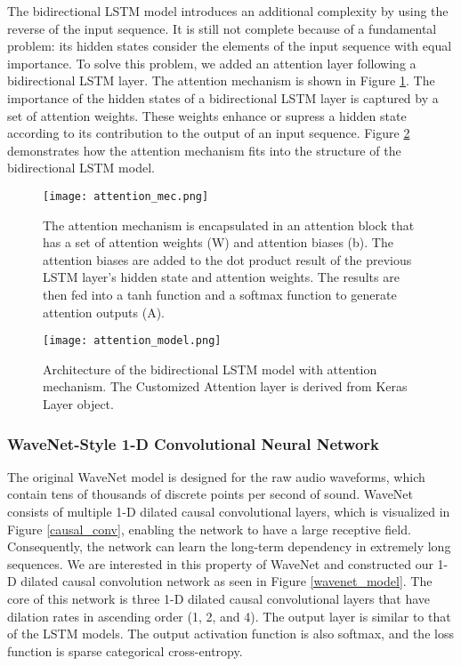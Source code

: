 \documentclass[sigconf,authorversion]{acmart}
\begin{document}
The bidirectional LSTM model introduces an additional complexity by using the 
reverse of the input sequence. It is still not complete because of a fundamental
problem: its hidden states consider the elements of the input sequence with 
equal importance. To solve this problem, we added an attention layer following 
a bidirectional LSTM layer. The attention mechanism is shown in Figure 
\ref{attention_mechanism}. The importance of the hidden states of a bidirectional 
LSTM layer is captured by a set of attention weights. These weights enhance or 
supress a hidden state according to its contribution to the output of an input
sequence. Figure \ref{att_lstm_model} demonstrates how the attention mechanism
fits into the structure of the bidirectional LSTM model.

\begin{figure}[h]
  \centering
  \texttt{[image: attention\_mec.png]}
  \caption{The attention mechanism is encapsulated in an attention block that has
  a set of attention weights (W) and attention biases (b). The attention biases are
  added to the dot product result of the previous LSTM layer's hidden state and 
  attention weights. The results are then fed into a tanh function and a softmax
  function to generate attention outputs (A).}
  \label{attention_mechanism}
\end{figure}

\begin{figure}[h]
  \centering
  \texttt{[image: attention\_model.png]}
  \caption{Architecture of the bidirectional LSTM model with attention mechanism.
  The Customized Attention layer is derived from Keras Layer object.}
  \label{att_lstm_model}
\end{figure}

\subsubsection{WaveNet-Style 1-D Convolutional Neural Network}

The original WaveNet model is designed for the raw audio waveforms, which contain
tens of thousands of discrete points per second of sound. WaveNet consists of 
 multiple 1-D dilated causal convolutional layers, which is visualized in Figure 
 \ref{causal_conv}, enabling the network to have a large receptive field. Consequently,
 the network can learn the long-term dependency in extremely long sequences. We are
 interested in this property of WaveNet and constructed our 1-D dilated causal 
 convolution network as seen in Figure \ref{wavenet_model}. The core of this network
 is three 1-D dilated causal convolutional layers that have dilation rates in ascending order 
 (1, 2, and 4). The output layer is similar to that of the LSTM models. The output activation 
 function is also softmax, and the loss function is sparse categorical cross-entropy.
\end{document}
